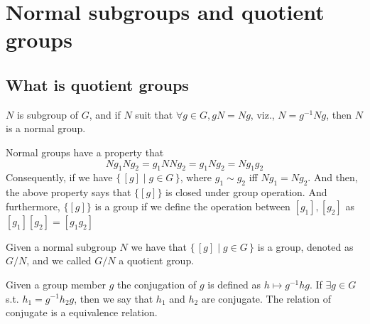 \documentclass[../main.tex]{subfiles}
\begin{document}
\chapter{Normal subgroups and quotient groups}
\section{What is quotient groups}
\begin{definition}\label{def:Normal subgroups}
\(N\) is subgroup of \(G\), and if \(N\) suit that \(\forall g \in G, g N = N g\), viz., \( N = g ^{-1} N g\),
then \(N\) is a normal group. 
\end{definition}
Normal groups have a property that 
\[
 N g_1 N g_2 = g_1 N N g_2  = g_1 N g_2 = N g_1 g_2
\]
Consequently, if we have \( \{ \, [g] \mid g \in G \,\} \), where \(g_1 \sim g_2\) iff \( N g_1 = N g_2\). And then, 
the above property says that \( \{ [g]\}\) is closed under group operation. And furthermore, \(\{ [g]\}\) is a group if we define the operation between \( [ g_{1}] , [g _{2}]\) as \( [g _{1} ] [g_{2}] = [g _{1} g _{2}]\) 
\begin{definition}\label{def:Quotient groups}
	Given a normal subgroup \(N\) we have that \(\{ \, [g] \mid g \in G \,\}\)  is a group, denoted as 
	\(G / N\), and we called \(G / N\) a quotient group.
\end{definition}
\begin{definition}[Conjugate]\label{def:Conjugate}
Given a group member \(g\) the conjugation of \(g\) is defined as \( h \mapsto g ^{-1} h g\). If \(\exists g \in G\)
s.t. \(h_1 = g ^{-1} h_2 g \), then we say that \(h_1\) and \(h_2\) are conjugate. The relation of conjugate is 
a equivalence relation.
\end{definition}
\end{document}
